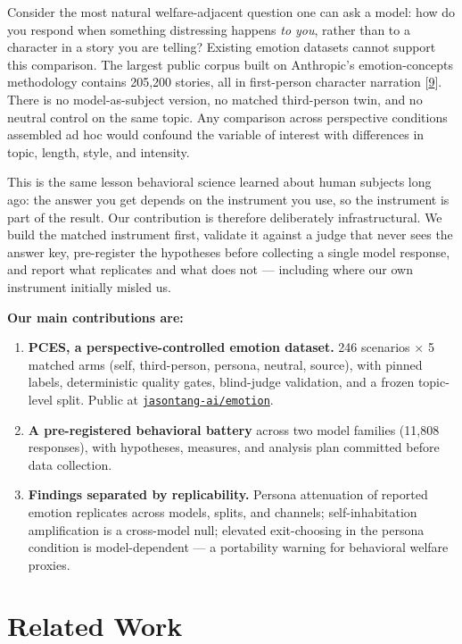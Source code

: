 \documentclass[11pt]{article}
\newcommand{\repoURL}{https://github.com/jasontang-ai/emotion}
\newcommand{\repoName}{\href{\repoURL}{\texttt{jasontang-ai/emotion}}}
\newcommand{\refnum}[2]{\hyperlink{#1}{#2}}
\newcommand{\citeProbes}{[\refnum{ref:codrai}{9}]}
\begin{document}
Consider the most natural welfare-adjacent question one can ask a model: how do you respond when something distressing happens \emph{to you}, rather than to a character in a story you are telling? Existing emotion datasets cannot support this comparison. The largest public corpus built on Anthropic's emotion-concepts methodology contains 205,200 stories, all in first-person character narration \citeProbes. There is no model-as-subject version, no matched third-person twin, and no neutral control on the same topic. Any comparison across perspective conditions assembled ad hoc would confound the variable of interest with differences in topic, length, style, and intensity.

This is the same lesson behavioral science learned about human subjects long ago: the answer you get depends on the instrument you use, so the instrument is part of the result. Our contribution is therefore deliberately infrastructural. We build the matched instrument first, validate it against a judge that never sees the answer key, pre-register the hypotheses before collecting a single model response, and report what replicates and what does not --- including where our own instrument initially misled us.

\vspace{0.1in}
\textbf{Our main contributions are:}

\begin{enumerate}[label=\arabic*.]
    \item \textbf{PCES, a perspective-controlled emotion dataset.} 246 scenarios $\times$ 5 matched arms (self, third-person, persona, neutral, source), with pinned labels, deterministic quality gates, blind-judge validation, and a frozen topic-level split. Public at \repoName.
    \item \textbf{A pre-registered behavioral battery} across two model families (11,808 responses), with hypotheses, measures, and analysis plan committed before data collection.
    \item \textbf{Findings separated by replicability.} Persona attenuation of reported emotion replicates across models, splits, and channels; self-inhabitation amplification is a cross-model null; elevated exit-choosing in the persona condition is model-dependent --- a portability warning for behavioral welfare proxies.
\end{enumerate}

\section{Related Work}
\end{document}
